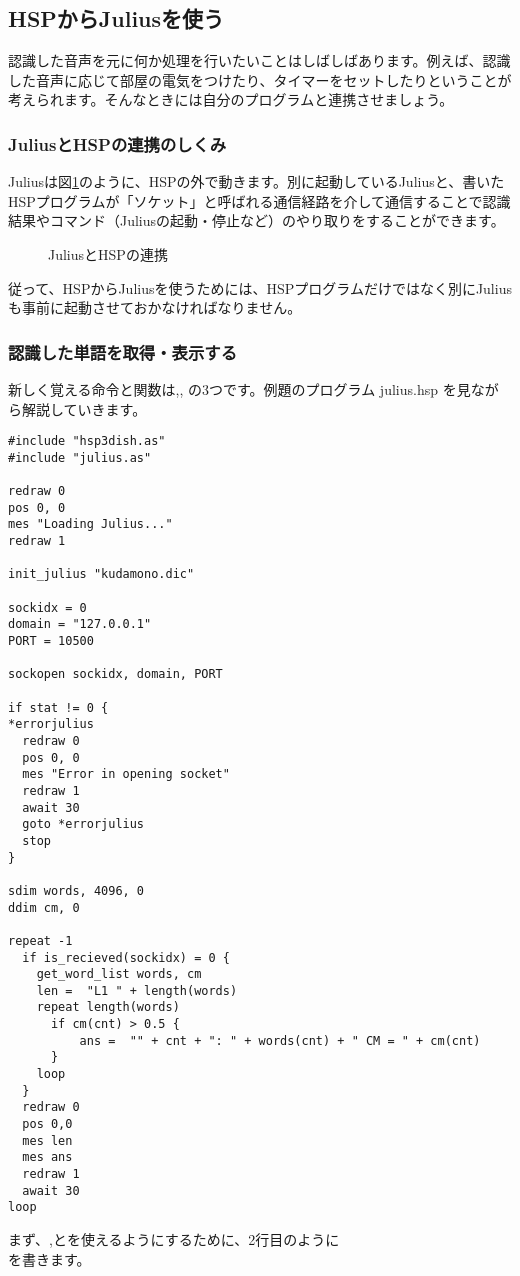 \subsection{HSPからJuliusを使う}
認識した音声を元に何か処理を行いたいことはしばしばあります。例えば、認識した音声に応じて部屋の電気をつけたり、タイマーをセットしたりということが考えられます。そんなときには自分のプログラムと連携させましょう。
\subsubsection{JuliusとHSPの連携のしくみ}
Juliusは図\ref{JuliusとHSPの連携}のように、HSPの外で動きます。別に起動しているJuliusと、書いたHSPプログラムが「ソケット」と呼ばれる通信経路を介して通信することで認識結果やコマンド（Juliusの起動・停止など）のやり取りをすることができます。
\begin{figure}[H]
\begin{center}
    
    \caption{JuliusとHSPの連携}
    \label{JuliusとHSPの連携}
\end{center}
\end{figure}
従って、HSPからJuliusを使うためには、HSPプログラムだけではなく別にJuliusも事前に起動させておかなければなりません。

\subsubsection{認識した単語を取得・表示する}
新しく覚える命令と関数は,,  の3つです。例題のプログラム julius.hsp を見ながら解説していきます。\\
\begin{lstlisting}[caption=julius.hsp,label=julius.hsp]
#include "hsp3dish.as"
#include "julius.as"

redraw 0
pos 0, 0
mes "Loading Julius..."
redraw 1

init_julius "kudamono.dic"

sockidx = 0
domain = "127.0.0.1"
PORT = 10500

sockopen sockidx, domain, PORT

if stat != 0 {
*errorjulius
  redraw 0
  pos 0, 0
  mes "Error in opening socket"
  redraw 1
  await 30
  goto *errorjulius
  stop
}

sdim words, 4096, 0
ddim cm, 0

repeat -1
  if is_recieved(sockidx) = 0 {
    get_word_list words, cm
    len =  "L1 " + length(words)
    repeat length(words)
      if cm(cnt) > 0.5 {
          ans =  "" + cnt + ": " + words(cnt) + " CM = " + cm(cnt)
      }
    loop
  }
  redraw 0
  pos 0,0
  mes len
  mes ans
  redraw 1
  await 30
loop
\end{lstlisting}
まず、,とを使えるようにするために、2行目のように\\
を書きます。

